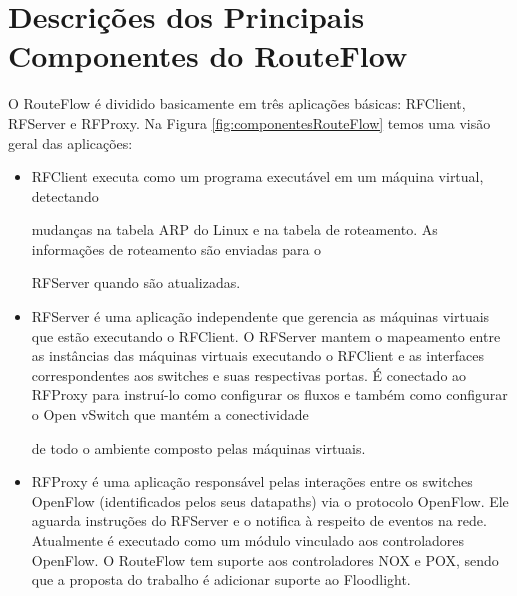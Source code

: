 \section{Descrições dos Principais Componentes 
do RouteFlow}

O RouteFlow é dividido basicamente em três 
aplicações básicas: RFClient, RFServer e 
RFProxy. Na Figura 
\ref{fig:componentesRouteFlow} temos uma visão 
geral das aplicações:

\begin{itemize}
\item RFClient executa como um programa 
executável em um máquina virtual, detectando 

mudanças na tabela 
ARP do Linux e na tabela de roteamento. As 
informações de roteamento são enviadas para o 

RFServer 
quando 
são atualizadas.

\item RFServer é uma aplicação independente 
que gerencia as máquinas virtuais que estão 
executando o 
RFClient. O RFServer mantem o mapeamento entre 
as instâncias das máquinas virtuais 
executando 
o 
RFClient 
e as interfaces correspondentes aos switches e 
suas respectivas portas. É conectado ao 
RFProxy para 
instruí-lo como configurar os fluxos e também 
como configurar o Open vSwitch que mantém a 
conectividade 

de todo o ambiente composto pelas máquinas 
virtuais.

\item RFProxy é uma aplicação responsável 
pelas interações entre os switches OpenFlow 
(identificados 
pelos seus datapaths) via o protocolo 
OpenFlow. Ele aguarda instruções do RFServer 
e 
o notifica à 
respeito de eventos na rede. Atualmente é 
executado como um módulo vinculado aos 
controladores 
OpenFlow. 
O RouteFlow tem suporte aos controladores NOX 
e POX, sendo que a proposta do trabalho é 
adicionar 
suporte ao Floodlight.
\end{itemize}

